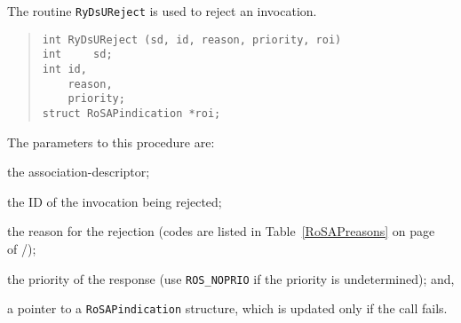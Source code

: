 The routine \verb"RyDsUReject" is used to reject an invocation.
\begin{quote}\small\begin{verbatim}
int	RyDsUReject (sd, id, reason, priority, roi)
int     sd;
int	id,
	reason,
	priority;
struct RoSAPindication *roi;
\end{verbatim}\end{quote}
The parameters to this procedure are:
\begin{describe}
\item[\verb"sd":] the association-descriptor;

\item[\verb"id":] the ID of the invocation being rejected;

\item[\verb"reason":] the reason for the rejection
(codes are listed in Table~\ref{RoSAPreasons} on page~\pageref{RoSAPreasons}
of \volone/);

\item[\verb"priority":] the priority of the response
(use \verb"ROS_NOPRIO" if the priority is undetermined);
and,

\item[\verb"roi":] a pointer to a \verb"RoSAPindication" structure,
which is updated only if the call fails.
\end{describe}


